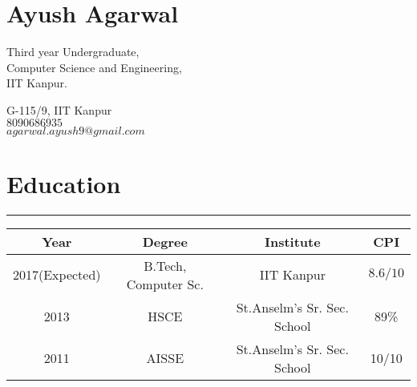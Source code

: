 \documentclass[a4paper]{article}
\author{Ayush Agarwal}
\begin{document}
\section*{\huge\textbf Ayush Agarwal}
\begin{minipage}{.45\linewidth}
\begin{flushleft}
 Third year Undergraduate,\\
 Computer Science and Engineering,\\
 IIT Kanpur.
 \end{flushleft}
 \end{minipage}
 \hfill
 \begin{minipage}{.45\linewidth}
 \begin{flushright}
 G-115/9, IIT Kanpur\\
 $8090686935$\\
 $agarwal.ayush9@gmail.com$\\
 \end{flushright}
 \end{minipage}
 \section*{Education}
 \hrule
 \begin{center}
 \vspace{3mm}
  \begin{tabular}{|c|c|c|c|}
  \hline
  Year & Degree & Institute & CPI\\
  \hline
  2017(Expected)& B.Tech, Computer Sc.&IIT Kanpur&$8.6/10$\\
  \hline
  2013& HSCE&St.Anselm's Sr. Sec. School&89\% \\
  \hline
  2011& AISSE&St.Anselm's Sr. Sec. School&10/10 \\
  \hline
  \end{tabular}
 \end{center} 
  
\end{document}
